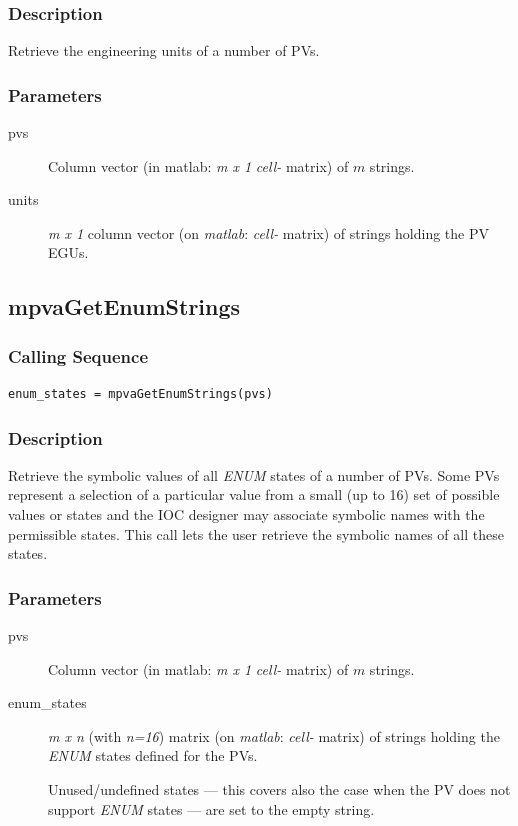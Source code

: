 \documentclass{article}
\newcommand{\matlab}{\ita{matlab}}
\newcommand{\pbrk}{\pagebreak[3]}
\newcommand{\MAXENUM}{16}
\newcommand{\ita}[1]{\emph{#1}}
\newcommand{\m}{$m$}
\newcommand{\mhack}{$m$} %
\newcommand{\n}{$n$}
\newcommand{\mxn}{$m\times n$}
\newcommand{\mxl}{$m\times 1$}
\newcommand{\inmath}[1]{$#1$}
\renewcommand{\m}{\ita{m}}
\newcommand{\mhack}{\ita{m}} %
\renewcommand{\n}{\ita{n}}
\renewcommand{\mxn}{\ita{m x n}}
\renewcommand{\mxl}{\ita{m x 1}}
\renewcommand{\pbrk}{}
\renewcommand{\inmath}[1]{\ita{#1}}
\newcommand{\PVITEM}{
\item[pvs] Column vector (in matlab: \mxl{} \ita{cell-} matrix)
of \mhack{} strings.
}
\begin{document}
\subsubsection{Description}
Retrieve the engineering units of a number of PVs.
\subsubsection{Parameters}
\begin{description}
\PVITEM
\item[units] \mxl{} column vector (on \matlab: \ita{cell-} matrix)
of strings holding the PV EGUs.
\end{description}

\vspace*{\fill}
\pbrk
\subsection{mpvaGetEnumStrings}
\subsubsection{Calling Sequence}
\begin{verbatim}
enum_states = mpvaGetEnumStrings(pvs)
\end{verbatim}
\subsubsection{Description}
Retrieve the symbolic values of all \ita{ENUM} states of a number of PVs.
Some PVs represent a selection of a particular value from a small (up to \MAXENUM)
set of possible values or states and the IOC designer may associate symbolic names
with the permissible states. This call lets the user retrieve the symbolic names
of all these states.

\subsubsection{Parameters}
\begin{description}
\PVITEM
\item[enum\_states] \mxn{} (with \n \inmath{=\MAXENUM}) matrix (on \matlab: \ita{cell-} matrix)
of strings holding the \ita{ENUM} states defined for the PVs.

Unused/undefined states --- this covers also the
case when the PV does not support \ita{ENUM} states --- are set to the empty string.
\end{description}
\end{document}
